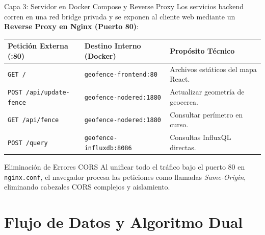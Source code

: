 \documentclass[aspectratio=43]{beamer}
\begin{document}
\begin{frame}{Capa 3: Servidor en Docker Compose y Reverse Proxy}
    \small
    Los servicios backend corren en una red bridge privada y se exponen al cliente web mediante un \textbf{Reverse Proxy en Nginx (Puerto 80)}:

    \vspace{0.15cm}
    \begin{table}
        \centering
        \scriptsize
        \begin{tabular}{p{2.6cm} p{3.2cm} p{4.0cm}}
            \toprule
            \textbf{Petición Externa (:80)} & \textbf{Destino Interno (Docker)} & \textbf{Propósito Técnico} \\
            \midrule
            \texttt{GET /} & \texttt{geofence-frontend:80} & Archivos estáticos del mapa React. \\
            \texttt{POST /api/update-fence} & \texttt{geofence-nodered:1880} & Actualizar geometría de geocerca. \\
            \texttt{GET /api/fence} & \texttt{geofence-nodered:1880} & Consultar perímetro en curso. \\
            \texttt{POST /query} & \texttt{geofence-influxdb:8086} & Consultas InfluxQL directas. \\
            \bottomrule
        \end{tabular}
    \end{table}

    \begin{alertblock}{Eliminación de Errores CORS}
        \scriptsize
        Al unificar todo el tráfico bajo el puerto 80 en \texttt{nginx.conf}, el navegador procesa las peticiones como llamadas \textit{Same-Origin}, eliminando cabezales CORS complejos y aislamiento.
    \end{alertblock}
\end{frame}

\section{Flujo de Datos y Algoritmo Dual}
\end{document}
